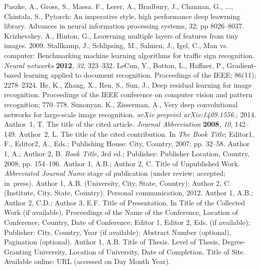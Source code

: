 \documentclass[journal,article,submit,moreauthors,pdftex]{Definitions/mdpi}
\begin{document}
\begin{thebibliography}{999}
Paszke, A., Gross, S., Massa. F., Lerer, A., Bradbury, J., Channan, G., ..., Chintala, S., Pytorch: An imperative style, high performance deep leawrning library. Advances in neural information processing systems, 32; pp 8026--8037.
Krizhevskey, A., Hinton, G., Leawrning multiple layers of features from tiny images. 2009.
Stallkamp, J., Schlipsing, M., Salmen, J., Igel, C., Man vs. computer: Benchmarking machine learning algorithms for traffic sign recognition. {\em Neural networks} {\bf 2012}, {\em 32}, 323--332.
LeCun, Y., Bottou, L., Haffner, P., Gradient-based learning applied to document recognition. Proceedings of the IEEE; 86(11); 2278--2324.
He, K., Zhang, X., Ren, S., Sun, J., Deep residual learning for image recognition. Proceedings of the IEEE conference on computer vision and pattern recognition; 770--778.
Simonyan, K., Zisserman, A., Very deep convolutional networks for large-scale image recognition. \textit{arXiv preprint arXiv:1409.1556.}; 2014.
Author~1, T. The title of the cited article. {\em Journal Abbreviation} {\bf 2008}, {\em 10}, 142--149.
Author~2, L. The title of the cited contribution. In {\em The Book Title}; Editor1, F., Editor2, A., Eds.; Publishing House: City, Country, 2007; pp. 32--58.
Author 1, A.; Author 2, B. \textit{Book Title}, 3rd ed.; Publisher: Publisher Location, Country, 2008; pp. 154--196.
Author 1, A.B.; Author 2, C. Title of Unpublished Work. \textit{Abbreviated Journal Name} stage of publication (under review; accepted; in~press).
Author 1, A.B. (University, City, State, Country); Author 2, C. (Institute, City, State, Country). Personal communication, 2012.
Author 1, A.B.; Author 2, C.D.; Author 3, E.F. Title of Presentation. In Title of the Collected Work (if available), Proceedings of the Name of the Conference, Location of Conference, Country, Date of Conference; Editor 1, Editor 2, Eds. (if available); Publisher: City, Country, Year (if available); Abstract Number (optional), Pagination (optional).
Author 1, A.B. Title of Thesis. Level of Thesis, Degree-Granting University, Location of University, Date of Completion.
Title of Site. Available online: URL (accessed on Day Month Year).
\end{thebibliography}
\end{document}
